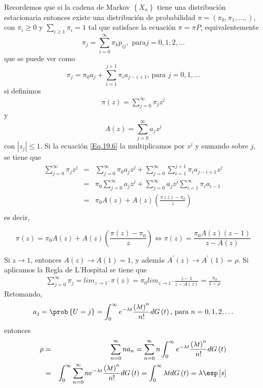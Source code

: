 Recordemos que si la cadena de Markov $\left\{X_{n}\right\}$ tiene una distribuci\'on estacionaria entonces existe una distribuci\'on de probabilidad $\pi=\left(\pi_{0},\pi_{1},\ldots,\right)$, con $\pi_{i}\geq0$ y $\sum_{i\geq1}\pi_{i}=1$ tal que satisface la
ecuaci\'on $\pi=\pi P$, equivalentemente
\begin{equation}\label{Eq.18.9}
\pi_{j}=\sum_{i=0}^{\infty}\pi_{k}p_{ij},\textrm{ para
}j=0,1,2,\ldots
\end{equation}
que se puede ver como
\begin{equation}\label{Eq.19.6}
\pi_{j}=\pi_{0}a_{j}+\sum_{i=1}^{j+1}\pi_{i}a_{j-i+1}\textrm{,
para }j=0,1,\ldots
\end{equation}
si definimos
\begin{eqnarray}
\pi\left(z\right)=\sum_{j=0}^{\infty}\pi_{j}z^{j}
\end{eqnarray}
y 
\begin{equation}
A\left(z\right)=\sum_{j=0}^{\infty}a_{j}z^{j}
\end{equation}
con $|z_{j}|\leq1$. Si la ecuaci\'on \ref{Eq.19.6} la multiplicamos por $z^{j}$ y sumando sobre $j$, se tiene que
\begin{eqnarray*}
\sum_{j=0}^{\infty}\pi_{j}z^{j}&=&\sum_{j=0}^{\infty}\pi_{0}a_{j}z^{j}+\sum_{j=0}^{\infty}\sum_{i=1}^{j+1}\pi_{i}a_{j-i+1}z^{j}\\
&=&\pi_{0}\sum_{j=0}^{\infty}a_{j}z^{j}+\sum_{j=0}^{\infty}a_{j}z^{j}\sum_{i=1}^{\infty}\pi_{i}a_{i-1}\\
&=&\pi_{0}A\left(z\right)+A\left(z\right)\left(\frac{\pi\left(z\right)-\pi_{0}}{z}\right)\\
\end{eqnarray*}
es decir,

\begin{equation}
\pi\left(z\right)=\pi_{0}A\left(z\right)+A\left(z\right)\left(\frac{\pi\left(z\right)-\pi_{0}}{z}\right)\Leftrightarrow\pi\left(z\right)=\frac{\pi_{0}A\left(z\right)\left(z-1\right)}{z-A\left(z\right)}
\end{equation}

Si $z\rightarrow1$, entonces $A\left(z\right)\rightarrow A\left(1\right)=1$, y adem\'as $A^{'}\left(z\right)\rightarrow A^{'}\left(1\right)=\rho$. Si aplicamos la Regla de L'Hospital se tiene que
\begin{eqnarray*}
\sum_{j=0}^{\infty}\pi_{j}=lim_{z\rightarrow1^{-}}\pi\left(z\right)=\pi_{0}lim_{z\rightarrow1^{-}}\frac{z-1}{z-A\left(z\right)}=\frac{\pi_{0}}{1-\rho}
\end{eqnarray*}
Retomando,
\begin{eqnarray*}
a_{j}=\prob\left\{U=j\right\}=\int_{0}^{\infty}e^{-\lambda
t}\frac{\left(\lambda t\right)^{n}}{n!}dG\left(t\right)\textrm{,
para }n=0,1,2,\ldots
\end{eqnarray*}
entonces
\begin{eqnarray*}
\rho&=&\sum_{n=0}^{\infty}na_{n}=\sum_{n=0}^{\infty}n\int_{0}^{\infty}e^{-\lambda t}\frac{\left(\lambda t\right)^{n}}{n!}dG\left(t\right)\\
&=&\int_{0}^{\infty}\sum_{n=0}^{\infty}ne^{-\lambda
t}\frac{\left(\lambda
t\right)^{n}}{n!}dG\left(t\right)=\int_{0}^{\infty}\lambda
tdG\left(t\right)=\lambda\esp\left[s\right]
\end{eqnarray*}

